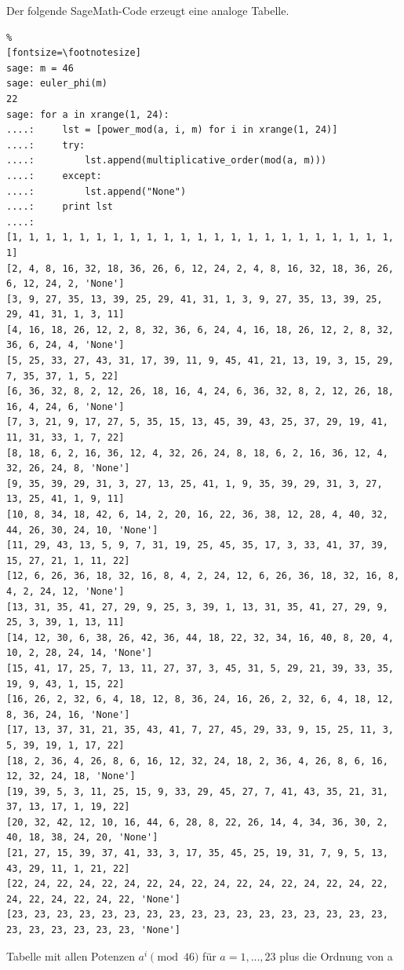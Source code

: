 \begin{refsegment}
Der folgende SageMath-Code erzeugt eine analoge Tabelle.

\begin{sagecode}
\begin{Verbatim}%
[fontsize=\footnotesize]
sage: m = 46
sage: euler_phi(m)
22
sage: for a in xrange(1, 24):
....:     lst = [power_mod(a, i, m) for i in xrange(1, 24)]
....:     try:
....:         lst.append(multiplicative_order(mod(a, m)))
....:     except:
....:         lst.append("None")
....:     print lst
....:
[1, 1, 1, 1, 1, 1, 1, 1, 1, 1, 1, 1, 1, 1, 1, 1, 1, 1, 1, 1, 1, 1, 1, 1]
[2, 4, 8, 16, 32, 18, 36, 26, 6, 12, 24, 2, 4, 8, 16, 32, 18, 36, 26, 6, 12, 24, 2, 'None']
[3, 9, 27, 35, 13, 39, 25, 29, 41, 31, 1, 3, 9, 27, 35, 13, 39, 25, 29, 41, 31, 1, 3, 11]
[4, 16, 18, 26, 12, 2, 8, 32, 36, 6, 24, 4, 16, 18, 26, 12, 2, 8, 32, 36, 6, 24, 4, 'None']
[5, 25, 33, 27, 43, 31, 17, 39, 11, 9, 45, 41, 21, 13, 19, 3, 15, 29, 7, 35, 37, 1, 5, 22]
[6, 36, 32, 8, 2, 12, 26, 18, 16, 4, 24, 6, 36, 32, 8, 2, 12, 26, 18, 16, 4, 24, 6, 'None']
[7, 3, 21, 9, 17, 27, 5, 35, 15, 13, 45, 39, 43, 25, 37, 29, 19, 41, 11, 31, 33, 1, 7, 22]
[8, 18, 6, 2, 16, 36, 12, 4, 32, 26, 24, 8, 18, 6, 2, 16, 36, 12, 4, 32, 26, 24, 8, 'None']
[9, 35, 39, 29, 31, 3, 27, 13, 25, 41, 1, 9, 35, 39, 29, 31, 3, 27, 13, 25, 41, 1, 9, 11]
[10, 8, 34, 18, 42, 6, 14, 2, 20, 16, 22, 36, 38, 12, 28, 4, 40, 32, 44, 26, 30, 24, 10, 'None']
[11, 29, 43, 13, 5, 9, 7, 31, 19, 25, 45, 35, 17, 3, 33, 41, 37, 39, 15, 27, 21, 1, 11, 22]
[12, 6, 26, 36, 18, 32, 16, 8, 4, 2, 24, 12, 6, 26, 36, 18, 32, 16, 8, 4, 2, 24, 12, 'None']
[13, 31, 35, 41, 27, 29, 9, 25, 3, 39, 1, 13, 31, 35, 41, 27, 29, 9, 25, 3, 39, 1, 13, 11]
[14, 12, 30, 6, 38, 26, 42, 36, 44, 18, 22, 32, 34, 16, 40, 8, 20, 4, 10, 2, 28, 24, 14, 'None']
[15, 41, 17, 25, 7, 13, 11, 27, 37, 3, 45, 31, 5, 29, 21, 39, 33, 35, 19, 9, 43, 1, 15, 22]
[16, 26, 2, 32, 6, 4, 18, 12, 8, 36, 24, 16, 26, 2, 32, 6, 4, 18, 12, 8, 36, 24, 16, 'None']
[17, 13, 37, 31, 21, 35, 43, 41, 7, 27, 45, 29, 33, 9, 15, 25, 11, 3, 5, 39, 19, 1, 17, 22]
[18, 2, 36, 4, 26, 8, 6, 16, 12, 32, 24, 18, 2, 36, 4, 26, 8, 6, 16, 12, 32, 24, 18, 'None']
[19, 39, 5, 3, 11, 25, 15, 9, 33, 29, 45, 27, 7, 41, 43, 35, 21, 31, 37, 13, 17, 1, 19, 22]
[20, 32, 42, 12, 10, 16, 44, 6, 28, 8, 22, 26, 14, 4, 34, 36, 30, 2, 40, 18, 38, 24, 20, 'None']
[21, 27, 15, 39, 37, 41, 33, 3, 17, 35, 45, 25, 19, 31, 7, 9, 5, 13, 43, 29, 11, 1, 21, 22]
[22, 24, 22, 24, 22, 24, 22, 24, 22, 24, 22, 24, 22, 24, 22, 24, 22, 24, 22, 24, 22, 24, 22, 'None']
[23, 23, 23, 23, 23, 23, 23, 23, 23, 23, 23, 23, 23, 23, 23, 23, 23, 23, 23, 23, 23, 23, 23, 'None']
\end{Verbatim}
\caption{Tabelle mit allen Potenzen $a^i \pmod{46}$ für $a=1,...,23$ plus die Ordnung von a}
\label{nt_Sage-code_MultOrder_expmod46}
\end{sagecode}





\end{refsegment}
